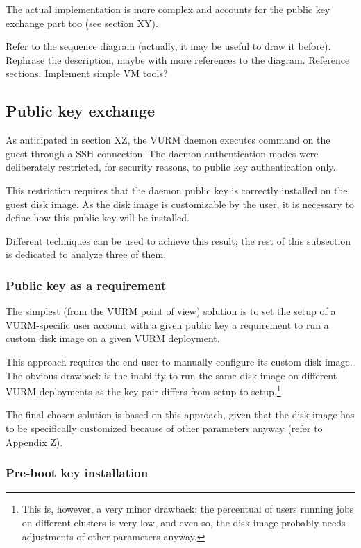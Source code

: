 The actual implementation is more complex and accounts for the public key exchange part too (see section XY).


\begin{todo}
Refer to the sequence diagram (actually, it may be useful to draw it before).
Rephrase the description, maybe with more references to the diagram.
Reference sections.
Implement simple VM tools?
\end{todo}


\subsection{Public key exchange}

As anticipated in section XZ, the VURM daemon executes command on the guest through a SSH connection. The daemon authentication modes were deliberately restricted, for security reasons, to public key authentication only.

This restriction requires that the daemon public key is correctly installed on the guest disk image. As the disk image is customizable by the user, it is necessary to define how this public key will be installed.

Different techniques can be used to achieve this result; the rest of this subsection is dedicated to analyze three of them.

\subsubsection{Public key as a requirement}

The simplest (from the VURM point of view) solution is to set the setup of a VURM-specific user account with a given public key a requirement to run a custom disk image on a given VURM deployment.

This approach requires the end user to manually configure its custom disk image. The obvious drawback is the inability to run the same disk image on different VURM deployments as the key pair differs from setup to setup.\footnote{This is, however, a very minor drawback; the percentual of users running jobs on different clusters is very low, and even so, the disk image probably needs adjustments of other parameters anyway.}

The final chosen solution is based on this approach, given that the disk image has to be specifically customized because of other parameters anyway (refer to Appendix Z).

\subsubsection{Pre-boot key installation}

